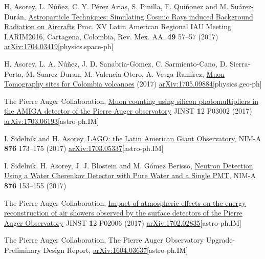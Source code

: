 \begin{etaremune}
\item {}H. Asorey, L. Núñez, C. Y. Pérez Arias, S. Pinilla, F. Quiñonez and M. Suárez-Durán, \href{http://www.astroscu.unam.mx/rmaa/RMxAC..49/PDF/RMxAC..49\_oral7.pdf}{{Astroparticle Techniques: Simulating Cosmic Rays induced Background Radiation on Aircrafts}} \en Proc.
XV Latin American Regional IAU Meeting LARIM2016, Cartagena, Colombia, Rev.
Mex.
AA, {\textbf{49}} 57--57 (2017) \href{http://arxiv.org/abs/1704.03419}{arXiv:1704.03419}[physics.space-ph]

\item {}H. Asorey, L. A. Núñez, J. D. Sanabria-Gomez, C. Sarmiento-Cano, D. Sierra-Porta, M. Suarez-Duran, M. Valencia-Otero, A. Vesga-Ramírez, \href{}{{Muon Tomography sites for Colombia volcanoes}} (2017) \href{http://arxiv.org/abs/1705.09884}{arXiv:1705.09884}[physics.geo-ph]

\item {}The Pierre Auger Collaboration, \href{https://doi.org/10.1088/1748-0221/12/03/P03002}{{Muon counting using silicon photomultipliers in the AMIGA detector of the Pierre Auger observatory}} JINST {\textbf 12} P03002 (2017) \href{http://arxiv.org/abs/1703.06193}{arXiv:1703.06193}[astro-ph.IM]

\item {}I. Sidelnik and H. Asorey, \href{https://doi.org/10.1016/j.nima.2017.02.069}{{LAGO: the Latin American Giant Observatory}}, NIM-A {\textbf{876}} 173--175 (2017) \href{http://arxiv.org/abs/1703.05337}{arXiv:1703.05337}[astro-ph.IM]

\item {} I. Sidelnik, H. Asorey, J. J. Blostein and M. Gómez Berisso, \href{https://doi.org/10.1016/j.nima.2017.02.048}{{Neutron Detection Using a Water Cherenkov Detector with Pure Water and a Single PMT}}, NIM-A {\textbf{876}} 153--155 (2017)

\item {}The Pierre Auger Collaboration, \href{https://doi.org/10.1088/1748-0221/12/02/P02006}{{Impact of atmospheric effects on the energy reconstruction of air showers observed by the surface detectors of the Pierre Auger Observatory}} JINST {\textbf 12} P02006 (2017) \href{http://arxiv.org/abs/1702.02835}{arXiv:1702.02835}[astro-ph.IM]

\item {} The Pierre Auger Collaboration, {{The Pierre Auger Observatory Upgrade-Preliminary Design Report}}, \href{http://arxiv.org/abs/1604.03637}{arXiv:1604.03637}[astro-ph.IM]


\end{etaremune}
